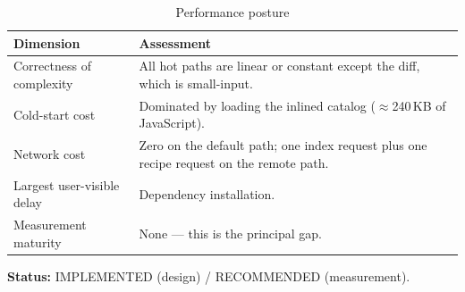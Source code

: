 \begin{table}[H]
\centering
\caption{Performance posture}
\begin{tabular}{@{}L{4.4cm}L{9.8cm}@{}}
\toprule
\textbf{Dimension} & \textbf{Assessment} \\
\midrule
Correctness of complexity & All hot paths are linear or constant except the diff,
which is small-input. \\
Cold-start cost & Dominated by loading the inlined catalog ($\approx$240\,KB of
JavaScript). \\
Network cost & Zero on the default path; one index request plus one recipe
request on the remote path. \\
Largest user-visible delay & Dependency installation. \\
Measurement maturity & None --- this is the principal gap. \\
\bottomrule
\end{tabular}
\end{table}

\textbf{Status:} IMPLEMENTED (design) / RECOMMENDED (measurement).
